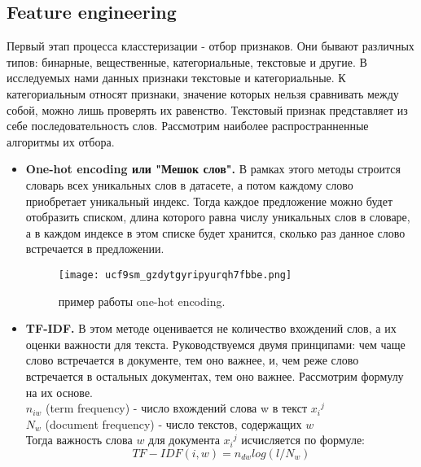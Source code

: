 \documentclass[a4paper]{article}
\begin{document}
 \subsection{Feature engineering}
 Первый этап процесса класстеризации - отбор признаков. Они бывают различных типов: бинарные, вещественные, категориальные, текстовые и другие. В исследуемых нами данных признаки текстовые и категориальные. К категориальным относят признаки, значение которых нельзя сравнивать между собой, можно лишь проверять их равенство. Текстовый признак представляет из себе последовательность слов. Рассмотрим наиболее распространненные алгоритмы их отбора.
 \begin{itemize} 
\item \textbf{One-hot encoding или "Мешок слов".} В рамках этого методы строится словарь всех уникальных слов в датасете, а потом каждому слово приобретает уникальный индекс. Тогда каждое предложение можно будет отобразить списком, длина которого равна числу уникальных слов в словаре, а в каждом индексе в этом списке будет хранится, сколько раз данное слово встречается в предложении. 
\begin{figure}[h!]
	\centering
	\texttt{[image: ucf9sm\_gzdytgyripyurqh7fbbe.png]}
	\caption{пример работы one-hot encoding.}
	\label{ris:image1}
\end{figure}
\item \textbf{TF-IDF.} В этом методе оценивается не количество вхождений слов, а их оценки важности для текста. Руководствуемся двумя принципами: чем чаще слово встречается в документе, тем оно важнее, и, чем реже слово встречается в остальных документах, тем оно важнее. Рассмотрим формулу на их основе. \\
${n_{iw}}$ (term frequency) - число вхождений слова w в текст ${x_{i}}^j$ \\
$N_{w}$ (document frequency) - число текстов, содержащих $w$ \\
Тогда важность слова $w$ для документа ${x_{i}}^j$ исчисляется по формуле: \\
\begin{equation*}
TF-IDF(i,w)=n_{dw} log(l/N_{w})
\end{equation*}

\end{itemize} 
\end{document}
